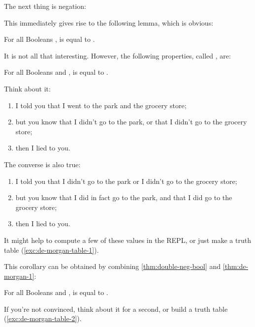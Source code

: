 The next thing is negation:


This immediately gives rise to the following lemma, which is obvious:

\begin{lemma}
  \label{thm:double-neg-bool}
  For all Booleans ,  is equal to .
\end{lemma}

It is not all that interesting. However, the following properties,
called , are:

\begin{lemma}
  \label{thm:de-morgan-1}
  For all Booleans  and ,  is
  equal to .
\end{lemma}

Think about it:

\begin{enumerate}
\item I told you that I went to the park and the grocery store;
\item but you know that I didn't go to the park, or that I didn't go
  to the grocery store;
\item then I lied to you.
\end{enumerate}

The converse is also true:

\begin{enumerate}
\item I told you that I didn't go to the park or I didn't go to the grocery store;
\item but you know that I did in fact go to the park, and that I did
  go to the grocery store;
\item then I lied to you.
\end{enumerate}

It might help to compute a few of these values in the REPL, or just
make a truth table (\cref{exc:de-morgan-table-1}).

This corollary can be obtained by combining \cref{thm:double-neg-bool}
and \cref{thm:de-morgan-1}:

\begin{corollary}
  \label{thm:de-morgan-2}
  For all Booleans  and ,  is equal
  to .
\end{corollary}

If you're not convinced, think about it for a second, or build a truth
table (\cref{exc:de-morgan-table-2}).

